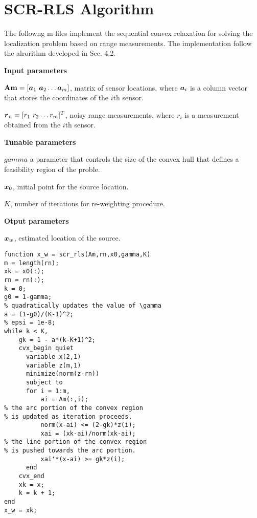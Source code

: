 \section{SCR-RLS Algorithm}

The followng m-files implement the sequential convex relaxation for solving the localization problem based on range measurements. The implementation follow the alrorithm developed in Sec. 4.2.

\phantom{m}

\noindent
\textbf{Input parameters}

\noindent
$\mbox{\textbf{Am}} = [\mbox{\boldmath$a$}_1 \ \mbox{\boldmath$a$}_2 \ldots \mbox{\boldmath$a$}_m]$, matrix of sensor locations, where $\mbox{\boldmath$a$}_i$ is a column vector that stores the coordinates of the $i$th sensor.

\noindent
$\mbox{\boldmath$r$}_n = [r_1 \ r_2 \ldots r_m]^T$, noisy range measurements, where $r_i$ is a measurement obtained from the $i$th sensor.

\noindent
\textbf{Tunable parameters}

\noindent
$gamma$ a parameter that controls the size of the convex hull that defines a feasibility region of the proble.

\noindent
$\mbox{\boldmath$x$}_0$, initial point for the source location.

\noindent
$K$, number of iterations for re-weighting procedure.

\noindent
\textbf{Otput parameters}

\noindent
$\mbox{\boldmath$x$}_w$, estimated location of the source.

\phantom{m}

\begin{lstlisting}
function x_w = scr_rls(Am,rn,x0,gamma,K)
m = length(rn);
xk = x0(:);
rn = rn(:);
k = 0;
g0 = 1-gamma;
% quadratically updates the value of \gamma
a = (1-g0)/(K-1)^2;        
% epsi = 1e-8;
while k < K,
    gk = 1 - a*(k-K+1)^2;   
    cvx_begin quiet
      variable x(2,1)
      variable z(m,1)
      minimize(norm(z-rn))
      subject to
      for i = 1:m,
          ai = Am(:,i);
% the arc portion of the convex region 
% is updated as iteration proceeds.
          norm(x-ai) <= (2-gk)*z(i);  
          xai = (xk-ai)/norm(xk-ai);
% the line portion of the convex region 
% is pushed towards the arc portion.
          xai'*(x-ai) >= gk*z(i);     
      end
    cvx_end
    xk = x;
    k = k + 1;
end
x_w = xk;
\end{lstlisting}